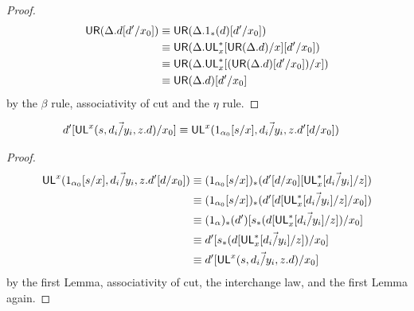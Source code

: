 \begin{proof}
\begin{align*}
\mathsf{UR}(\Delta.d[d'/x_0])
&\equiv \mathsf{UR}(\Delta.1_*(d)[d'/x_0]) \\
&\equiv \mathsf{UR}(\Delta.\mathsf{UL}^*_{x}[\mathsf{UR}(\Delta.d)/x][d'/x_0]) \\
&\equiv \mathsf{UR}(\Delta.\mathsf{UL}^*_{x}[(\mathsf{UR}(\Delta.d)[d'/x_0])/x])\\
&\equiv \mathsf{UR}(\Delta.d)[d'/x_0]
\end{align*}
by the $\beta$ rule, associativity of cut and the $\eta$ rule.
\end{proof}

\begin{lemma}
\begin{align*}
d'[\mathsf{UL}^{x}_{}(s,\vec{d_i/y_i},z.d)/x_0] &\equiv \mathsf{UL}^{x}_{}(1_{\alpha_0}[s/x],\vec{d_i/y_i},z.d'[d/x_0])
\end{align*}
\end{lemma}
\begin{proof}
\begin{align*}
\mathsf{UL}^{x}_{}(1_{\alpha_0}[s/x],\vec{d_i/y_i},z.d'[d/x_0])
&\equiv (1_{\alpha_0}[s/x])_*(d'[d/x_0][\mathsf{UL}^*_{x}[\vec{d_i/y_i}]/z]) \\
&\equiv (1_{\alpha_0}[s/x])_*(d'[d[\mathsf{UL}^*_{x}[\vec{d_i/y_i}]/z]/x_0]) \\
&\equiv (1_\alpha)_*(d')[s_*(d[\mathsf{UL}^*_{x}[\vec{d_i/y_i}]/z])/x_0] \\
&\equiv d'[s_*(d[\mathsf{UL}^*_{x}[\vec{d_i/y_i}]/z])/x_0] \\
&\equiv d'[\mathsf{UL}^{x}_{}(s,\vec{d_i/y_i},z.d)/x_0]
\end{align*}
by the first Lemma, associativity of cut, the interchange law, and the first Lemma again.
\end{proof}

